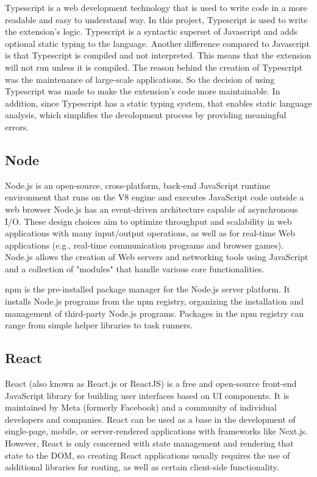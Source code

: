 Typescript is a web development technology that is used to write code in a more readable and easy to understand way. In this project, Typescript is used to write the extension's logic.
Typescript is a syntactic superset of Javascript and adds optional static typing to the language. Another difference compared to Javascript is that Typescript is compiled and not interpreted. This means that the extension will not run unless it is compiled. The reason behind the creation of Typescript was the maintenance of large-scale applications. So the decision of using Typescript was made to make the extension's code more maintainable.
In addition, since Typescript has a static typing system, that enables static language analysis, which simplifies the devolopment process by providing meaningful errors.
\subsection {Node}

Node.js is an open-source, cross-platform, back-end JavaScript runtime environment that runs on the V8 engine and executes JavaScript code outside a web browser
Node.js has an event-driven architecture capable of asynchronous I/O. These design choices aim to optimize throughput and scalability in web applications with many input/output operations, as well as for real-time Web applications (e.g., real-time communication programs and browser games).
Node.js allows the creation of Web servers and networking tools using JavaScript and a collection of "modules" that handle various core functionalities.

npm is the pre-installed package manager for the Node.js server platform. It installs Node.js programs from the npm registry, organizing the installation and management of third-party Node.js programs. Packages in the npm registry can range from simple helper libraries to task runners.

\subsection {React}

React (also known as React.js or ReactJS) is a free and open-source front-end JavaScript library for building user interfaces based on UI components. It is maintained by Meta (formerly Facebook) and a community of individual developers and companies. React can be used as a base in the development of single-page, mobile, or server-rendered applications with frameworks like Next.js. However, React is only concerned with state management and rendering that state to the DOM, so creating React applications usually requires the use of additional libraries for routing, as well as certain client-side functionality.

